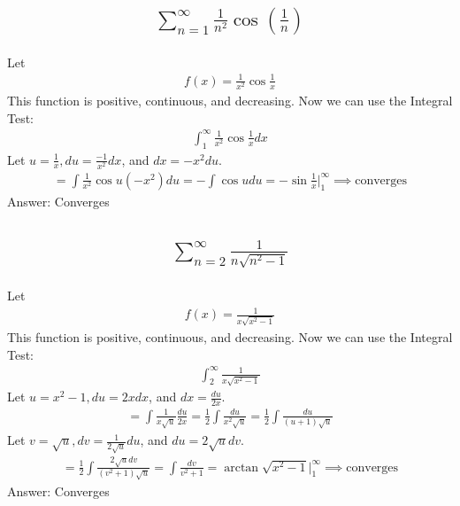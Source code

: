 \documentclass{article}
\begin{document}
\subsection{
	\begin{align*}
		\sum_{n = 1}^\infty \frac{1}{n^2} \cos{\left( \frac{1}{n} \right)}
	\end{align*}
}
Let
\begin{align*}
	f(x) = \frac{1}{x^2} \cos{\frac{1}{x}}
\end{align*}
This function is positive, continuous, and decreasing. Now we can use the Integral Test:
\begin{align*}
	\int_1^\infty {\frac{1}{x^2} \cos{\frac{1}{x}}} dx
\end{align*}
Let $u = \frac{1}{x}, du = \frac{-1}{x^2} dx$, and $dx = -x^2 du$. 
\begin{align*}
	= \int{\frac{1}{x^2} \cos{u} (-x^2) du} = -\int{\cos{u} du} = -\sin{\frac{1}{x}} \bigg|_1^\infty \implies \text{converges}
\end{align*}
Answer: Converges

\subsection{
	\begin{align*}
		\sum_{n = 2}^\infty \frac{1}{n \sqrt{n^2 - 1}}
	\end{align*}
}
Let
\begin{align*}
	f(x) = \frac{1}{x \sqrt{x^2 - 1}}
\end{align*}
This function is positive, continuous, and decreasing. Now we can use the Integral Test:
\begin{align*}
	\int_2^\infty {\frac{1}{x \sqrt{x^2 - 1}}}
\end{align*}
Let $u = x^2 - 1, du = 2x dx$, and $dx = \frac{du}{2x}$. 
\begin{align*}
	= \int{\frac{1}{x \sqrt{u}} \frac{du}{2x}} = \frac{1}{2} \int{\frac{du}{x^2 \sqrt{u}}} = \frac{1}{2} \int{\frac{du}{(u + 1) \sqrt{u}}}
\end{align*}
Let $v = \sqrt{u}, dv = \frac{1}{2\sqrt{u}} du$, and $du = 2\sqrt{u} dv$. 
\begin{align*}
	= \frac{1}{2} \int{\frac{2 \sqrt{u} dv}{(v^2 + 1) \sqrt{u}}} = \int{ \frac{dv}{v^2 + 1} } = \arctan{\sqrt{x^2 - 1}} \bigg|_1^\infty \implies \text{converges}
\end{align*}
Answer: Converges

\end{document}
